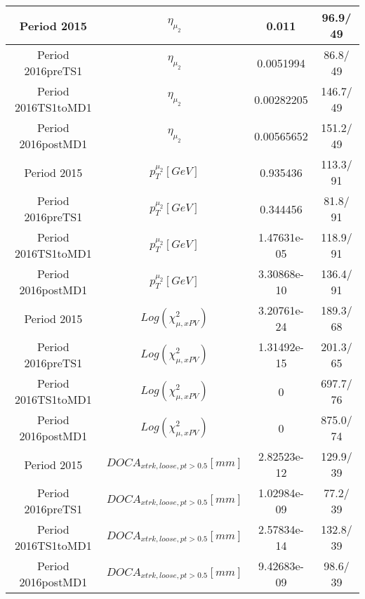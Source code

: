 \documentclass{article}
\begin{document}
\begin{longtable}{c|c|c|c}
\hline
 Period 2015 & $\eta_{\mu_{2}}$ & 0.011 &  96.9/ 49\\
\hline
 Period 2016preTS1 & $\eta_{\mu_{2}}$ & 0.0051994 &  86.8/ 49\\
\hline
 Period 2016TS1toMD1 & $\eta_{\mu_{2}}$ & 0.00282205 & 146.7/ 49\\
\hline
 Period 2016postMD1 & $\eta_{\mu_{2}}$ & 0.00565652 & 151.2/ 49\\
\hline
 Period 2015 & $p_{T}^{\mu_{2}} [GeV]$ & 0.935436 & 113.3/ 91\\
\hline
 Period 2016preTS1 & $p_{T}^{\mu_{2}} [GeV]$ & 0.344456 &  81.8/ 91\\
\hline
 Period 2016TS1toMD1 & $p_{T}^{\mu_{2}} [GeV]$ & 1.47631e-05 & 118.9/ 91\\
\hline
 Period 2016postMD1 & $p_{T}^{\mu_{2}} [GeV]$ & 3.30868e-10 & 136.4/ 91\\
\hline
 Period 2015 & $Log(\chi^{2}_{\mu,xPV})$ & 3.20761e-24 & 189.3/ 68\\
\hline
 Period 2016preTS1 & $Log(\chi^{2}_{\mu,xPV})$ & 1.31492e-15 & 201.3/ 65\\
\hline
 Period 2016TS1toMD1 & $Log(\chi^{2}_{\mu,xPV})$ & 0 & 697.7/ 76\\
\hline
 Period 2016postMD1 & $Log(\chi^{2}_{\mu,xPV})$ & 0 & 875.0/ 74\\
\hline
 Period 2015 & $DOCA_{xtrk, loose, pt>0.5} [mm]$ & 2.82523e-12 & 129.9/ 39\\
\hline
 Period 2016preTS1 & $DOCA_{xtrk, loose, pt>0.5} [mm]$ & 1.02984e-09 &  77.2/ 39\\
\hline
 Period 2016TS1toMD1 & $DOCA_{xtrk, loose, pt>0.5} [mm]$ & 2.57834e-14 & 132.8/ 39\\
\hline
 Period 2016postMD1 & $DOCA_{xtrk, loose, pt>0.5} [mm]$ & 9.42683e-09 &  98.6/ 39\\
\hline
\end{longtable}
\end{document}
